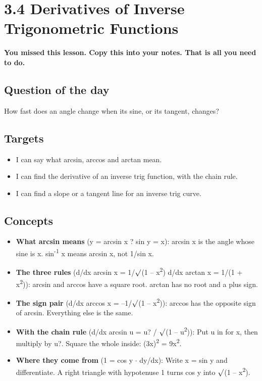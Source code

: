 \documentclass[11pt]{article}
\begin{document}
\section*{3.4 Derivatives of Inverse Trigonometric Functions}
\textbf{You missed this lesson. Copy this into your notes. That is all you need to do.}\par\medskip
\subsection*{Question of the day}
How fast does an angle change when its sine, or its tangent, changes?\par
\subsection*{Targets}\begin{itemize}\item I can say what arcsin, arccos and arctan mean.
\item I can find the derivative of an inverse trig function, with the chain rule.
\item I can find a slope or a tangent line for an inverse trig curve.\end{itemize}
\subsection*{Concepts}\begin{itemize}
\item \textbf{What arcsin means} (y = arcsin x  ?  sin y = x): arcsin x is the angle whose sine is x. sin\textsuperscript{-1} x means arcsin x, not 1/sin x.
\item \textbf{The three rules} (d/dx arcsin x = 1/$\surd$(1 -- x\textsuperscript{2})      d/dx arctan x = 1/(1 + x\textsuperscript{2})): arcsin and arccos have a square root. arctan has no root and a plus sign.
\item \textbf{The sign pair} (d/dx arccos x = --1/$\surd$(1 -- x\textsuperscript{2})): arccos has the opposite sign of arcsin. Everything else is the same.
\item \textbf{With the chain rule} (d/dx arcsin u = u? / $\surd$(1 -- u\textsuperscript{2})): Put u in for x, then multiply by u?. Square the whole inside: (3x)\textsuperscript{2} = 9x\textsuperscript{2}.
\item \textbf{Where they come from} (1 = cos y $\cdot$ dy/dx): Write x = sin y and differentiate. A right triangle with hypotenuse 1 turns cos y into $\surd$(1 -- x\textsuperscript{2}).
\end{itemize}
\end{document}
